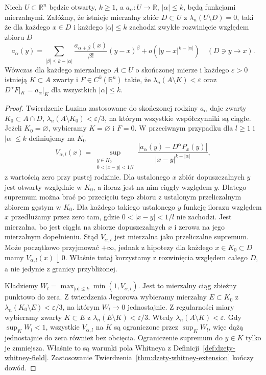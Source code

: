 \begin{twierdzenie}
\label{thm:dzety-lusin-higher}
Niech $U\subset\mathbb R^n$ będzie otwarty, $k\ge1$,
a $a_\alpha:U\to\mathbb R$, $|\alpha|\le k$,
będą funkcjami mierzalnymi. Załóżmy, że istnieje
mierzalny zbiór $D\subset U$ z
$\lambda_n(U\setminus D)=0$, taki że dla każdego
$x\in D$ i każdego $|\alpha|\le k$ zachodzi
zwykłe rozwinięcie względem zbioru $D$
\[
 a_\alpha(y)=\sum_{|\beta|\le k-|\alpha|}
 \frac{a_{\alpha+\beta}(x)}{\beta!}(y-x)^\beta
 +o(|y-x|^{k-|\alpha|})\quad(D\ni y\to x).
\]
Wówczas dla każdego mierzalnego $A\subset U$
o skończonej mierze i każdego $\varepsilon>0$
istnieją $K\subset A$ zwarty i
$F\in C^k(\mathbb R^n)$ takie, że
$\lambda_n(A\setminus K)<\varepsilon$ oraz
$D^\alpha F|_K=a_\alpha|_K$ dla wszystkich
$|\alpha|\le k$.
\end{twierdzenie}
\begin{proof}
Twierdzenie Luzina zastosowane do skończonej rodziny
$a_\alpha$ daje zwarty $K_0\subset A\cap D$,
$\lambda_n(A\setminus K_0)<\varepsilon/3$,
na którym wszystkie współczynniki są ciągłe.
Jeżeli $K_0=\varnothing$, wybieramy $K=\varnothing$
i $F=0$. W przeciwnym przypadku dla $l\ge1$
i $|\alpha|\le k$ definiujemy na $K_0$
\[
 V_{\alpha,l}(x)=
 \sup_{\substack{y\in K_0\\0<|x-y|<1/l}}
 \frac{|a_\alpha(y)-D^\alpha P_x(y)|}{|x-y|^{k-|\alpha|}},
\]
z wartością zero przy pustej rodzinie.
Dla ustalonego $x$ zbiór dopuszczalnych $y$ jest
otwarty względnie w $K_0$, a iloraz jest na nim
ciągły względem $y$. Dlatego supremum można
brać po przecięciu tego zbioru z ustalonym
przeliczalnym zbiorem gęstym w $K_0$.
Dla każdego takiego ustalonego $y$ funkcję
ilorazu względem $x$ przedłużamy przez zero tam,
gdzie $0<|x-y|<1/l$ nie zachodzi. Jest mierzalna,
bo jest ciągła na zbiorze dopuszczalnych $x$
i zerowa na jego mierzalnym dopełnieniu.
Stąd $V_{\alpha,l}$ jest mierzalna jako przeliczalne
supremum. Może początkowo przyjmować $+\infty$,
jednak z hipotezy dla każdego $x\in K_0\subset D$
mamy $V_{\alpha,l}(x)\downarrow0$.
Właśnie tutaj korzystamy z rozwinięcia względem
całego $D$, a nie jedynie z granicy przybliżonej.

Kładziemy $W_l=\max_{|\alpha|\le k}\min(1,V_{\alpha,l})$.
Jest to mierzalny ciąg zbieżny punktowo do zera.
Z twierdzenia Jegorowa wybieramy mierzalny
$E\subset K_0$ z $\lambda_n(K_0\setminus E)<\varepsilon/3$,
na którym $W_l\to0$ jednostajnie. Z regularności miary
wybieramy zwarty $K\subset E$ z
$\lambda_n(E\setminus K)<\varepsilon/3$.
Wtedy $\lambda_n(A\setminus K)<\varepsilon$.
Gdy $\sup_K W_l<1$, wszystkie $V_{\alpha,l}$
na $K$ są ograniczone przez $\sup_K W_l$,
więc dążą jednostajnie do zera również bez obcięcia.
Ograniczenie supremum do $y\in K$ tylko je zmniejsza.
Właśnie to są warunki pola Whitneya z
Definicji~\ref{def:dzety-whitney-field}. Zastosowanie
Twierdzenia~\ref{thm:dzety-whitney-extension}
kończy dowód.
\end{proof}

